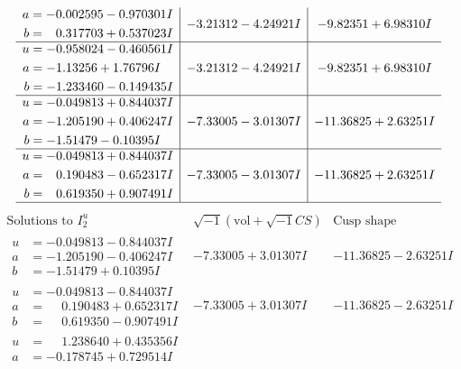 \documentclass[1p]{elsarticle_modified}
\theoremstyle{definition}
\newcommand{\I}{\sqrt{-1}}
\begin{document}
$$\begin{array}{c|c|c}
\begin{aligned}
a &= -0.002595 - 0.970301 I \\
b &= \phantom{-}0.317703 + 0.537023 I\end{aligned}
 & -3.21312 - 4.24921 I & -9.82351 + 6.98310 I \\ \hline\begin{aligned}
u &= -0.958024 - 0.460561 I \\
a &= -1.13256 + 1.76796 I \\
b &= -1.233460 - 0.149435 I\end{aligned}
 & -3.21312 - 4.24921 I & -9.82351 + 6.98310 I \\ \hline\begin{aligned}
u &= -0.049813 + 0.844037 I \\
a &= -1.205190 + 0.406247 I \\
b &= -1.51479 - 0.10395 I\end{aligned}
 & -7.33005 - 3.01307 I & -11.36825 + 2.63251 I \\ \hline\begin{aligned}
u &= -0.049813 + 0.844037 I \\
a &= \phantom{-}0.190483 - 0.652317 I \\
b &= \phantom{-}0.619350 + 0.907491 I\end{aligned}
 & -7.33005 - 3.01307 I & -11.36825 + 2.63251 I\\
 \hline 
 \end{array}$$\newpage$$\begin{array}{c|c|c}  
\text{Solutions to }I^u_{2}& \I (\text{vol} + \sqrt{-1}CS) & \text{Cusp shape}\\
 \hline 
\begin{aligned}
u &= -0.049813 - 0.844037 I \\
a &= -1.205190 - 0.406247 I \\
b &= -1.51479 + 0.10395 I\end{aligned}
 & -7.33005 + 3.01307 I & -11.36825 - 2.63251 I \\ \hline\begin{aligned}
u &= -0.049813 - 0.844037 I \\
a &= \phantom{-}0.190483 + 0.652317 I \\
b &= \phantom{-}0.619350 - 0.907491 I\end{aligned}
 & -7.33005 + 3.01307 I & -11.36825 - 2.63251 I \\ \hline\begin{aligned}
u &= \phantom{-}1.238640 + 0.435356 I \\
a &= -0.178745 + 0.729514 I \\

\end{aligned}
\end{array}$$
\end{document}
